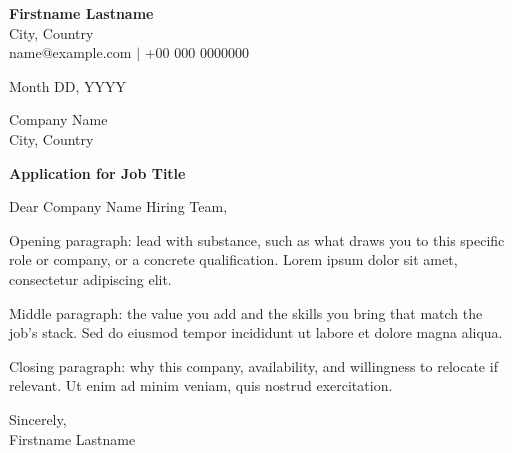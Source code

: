 \documentclass[letterpaper,11pt]{article}
\begin{document}
\textbf{\large Firstname Lastname} \\
City, Country \\
name@example.com $|$ +00 000 0000000

\vspace{0.3cm}

Month DD, YYYY

\vspace{0.3cm}

Company Name \\
City, Country

\vspace{0.3cm}

\textbf{Application for Job Title}

\vspace{0.1cm}

Dear Company Name Hiring Team,

Opening paragraph: lead with substance, such as what draws you to this specific role or company, or a concrete qualification. Lorem ipsum dolor sit amet, consectetur adipiscing elit.

Middle paragraph: the value you add and the skills you bring that match the job's stack. Sed do eiusmod tempor incididunt ut labore et dolore magna aliqua.

Closing paragraph: why this company, availability, and willingness to relocate if relevant. Ut enim ad minim veniam, quis nostrud exercitation.

\vspace{0.3cm}

Sincerely, \\
Firstname Lastname
\end{document}
